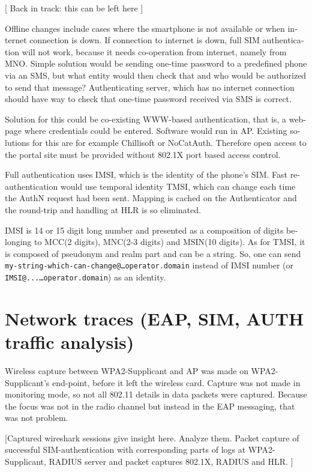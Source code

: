 \documentclass[12pt,a4paper,english]{tutthesis}
\begin{document}
\begin{otherlanguage}{english}
[ Back in track: this can be left here ]

Offline changes include cases where the smartphone is not available
 or when internet connection is down.
If connection to internet is down, full SIM authentication will not
work, because it needs co-operation from internet, namely from MNO.
Simple solution would be sending one-time password to a predefined
phone via an SMS, but what entity would then check that and who would
be authorized to send that message?
Authenticating server, which has no internet connection should 
have way to check that one-time password received via SMS is correct.

Solution for this could be co-existing WWW-based authentication, that
is, a web-page where credentials could be entered.
Software would run in AP. Existing solutions for this are for example
Chillisoft or NoCatAuth. 
Therefore open access to the portal site must be provided without
802.1X port based access control.


Full authentication uses IMSI, which is the identity of the phone's SIM.
Fast re-authentication would use temporal identity TMSI, which 
can change each time the AuthN request had been sent. Mapping
is cached on the  Authenticator and the round-trip and handling at HLR is
so eliminated. 

IMSI is 14 or 15 digit long number and presented as a composition
of digits belonging to MCC(2 digits), MNC(2-3 digits) and MSIN(10 digits).
As for TMSI, it is composed of pseudonym and realm part and can be a
string. So, one can send 
\texttt{my-string-which-can-change@…operator.domain} instead of 
IMSI number (or \texttt{IMSI@...…operator.domain}) as an identity. 


\section{Network traces (EAP, SIM, AUTH traffic analysis)}
\label{sec-5-4}
Wireless capture between WPA2-Supplicant and AP was made on
WPA2-Supplicant's end-point, before it left the wireless card. Capture was
not made in monitoring mode, so not all 802.11 details in
data packets were captured\cite{wireshark-capture}.
Because the focus was not in the radio channel but instead in the EAP messaging, that was not problem.


[Captured wireshark sessions give insight here. Analyze them.
Packet capture of successful SIM-authentication with corresponding
parts of logs at WPA2-Supplicant, RADIUS server and packet captures 
802.1X, RADIUS and HLR. ]


\end{otherlanguage}
\end{document}
